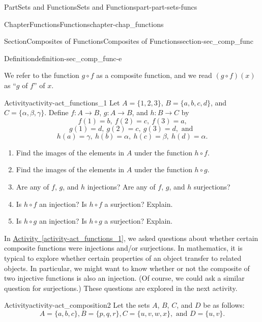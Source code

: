 \documentclass[oneside,10pt,]{book}
\newcommand{\xreffont}{\relax}
\numberwithin{equation}{chapter}
\begin{document}
\begin{partptx}{Part}{Sets and Functions}{}{Sets and Functions}{}{}{part-part-sets-funcs}
\begin{chapterptx}{Chapter}{Functions}{}{Functions}{}{}{chapter-chap_functions}
\begin{sectionptx}{Section}{Composites of Functions}{}{Composites of Functions}{}{}{section-sec_comp_func}
\begin{definition}{Definition}{}{definition-sec_comp_func-e}
\end{definition}
We refer to the function \(g \circ f\) as a composite function, and we read \((g \circ f)(x)\) as ``\(g\) of \(f\)'' of \(x\).%
\begin{activity}{Activity}{}{activity-act_functions_1}%
Let \(A = \{1, 2, 3\}\), \(B = \{a, b, c, d\}\), and \(C = \{\alpha, \beta, \gamma\}\). Define \(f : A \to B\), \(g : A \to B\), and \(h : B \to C\) by%
\begin{equation*}
f(1) = b, \ f(2) = c, \  f(3) = a\text{,}
\end{equation*}
%
\begin{equation*}
g(1) = d, \ g(2) = c, \  g(3) = d, \text{ and }
\end{equation*}
%
\begin{equation*}
h(a) = \gamma, \ h(b) = \alpha, \ h(c) = \beta,  \ h(d) = \alpha\text{.}
\end{equation*}
%
\begin{enumerate}[font=\bfseries,label=(\alph*),ref=\alph*]%
\item{}Find the images of the elements in \(A\) under the function \(h \circ f\).%
\item{}Find the images of the elements in \(A\) under the function \(h \circ g\).%
\item{}Are any of \(f\), \(g\), and \(h\) injections? Are any of \(f\), \(g\), and \(h\) surjections?%
\item{}Is \(h \circ f\) an injection? Is \(h \circ f\) a surjection? Explain.%
\item{}Is \(h \circ g\) an injection? Is \(h \circ g\) a surjection? Explain.%
\end{enumerate}%
\end{activity}%
In \hyperref[activity-act_functions_1]{Activity~{\xreffont\ref{activity-act_functions_1}}}, we asked questions about whether certain composite functions were injections and\slash{}or surjections. In mathematics, it is typical to explore whether certain properties of an object transfer to related objects. In particular, we might want to know whether or not the composite of two injective functions is also an injection. (Of course, we could ask a similar question for surjections.) These questions are explored in the next activity.%
\begin{activity}{Activity}{}{activity-act_composition2}%
Let the sets \(A\), \(B\), \(C\), and \(D\) be as follows:%
\begin{equation*}
A = \{ a, b, c \},  B = \{p, q, r\},  C = \{u, v, w, x \},  \text{ and }   D = \{u, v \}\text{.}

\end{equation*}
\end{activity}
\end{sectionptx}
\end{chapterptx}
\end{partptx}
\end{document}
